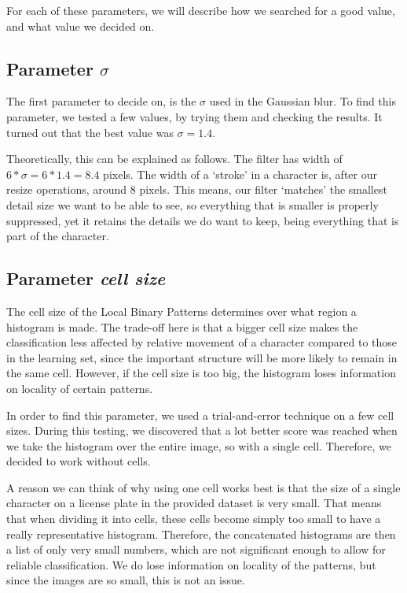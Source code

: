 \documentclass[a4paper]{article}
\begin{document}
For each of these parameters, we will describe how we searched for a good
value, and what value we decided on.

\subsection{Parameter $\sigma$}

The first parameter to decide on, is the $\sigma$ used in the Gaussian blur. To
find this parameter, we tested a few values, by trying them and checking the
results. It turned out that the best value was $\sigma = 1.4$.

Theoretically, this can be explained as follows. The filter has width of
$6 * \sigma = 6 * 1.4 = 8.4$ pixels. The width of a `stroke' in a character is,
after our resize operations, around 8 pixels. This means, our filter `matches'
the smallest detail size we want to be able to see, so everything that is
smaller is properly suppressed, yet it retains the details we do want to keep,
being everything that is part of the character.

\subsection{Parameter \emph{cell size}}

The cell size of the Local Binary Patterns determines over what region a
histogram is made. The trade-off here is that a bigger cell size makes the
classification less affected by relative movement of a character compared to
those in the learning set, since the important structure will be more likely to
remain in the same cell. However, if the cell size is too big, the histogram
loses information on locality of certain patterns.

In order to find this parameter, we used a trial-and-error technique on a few
cell sizes. During this testing, we discovered that a lot better score was
reached when we take the histogram over the entire image, so with a single
cell. Therefore, we decided to work without cells.

A reason we can think of why using one cell works best is that the size of a
single character on a license plate in the provided dataset is very small.
That means that when dividing it into cells, these cells become simply too
small to have a really representative histogram. Therefore, the
concatenated histograms are then a list of only very small numbers, which
are not significant enough to allow for reliable classification. We do lose
information on locality of the patterns, but since the images are so small,
this is not an issue.
\end{document}
